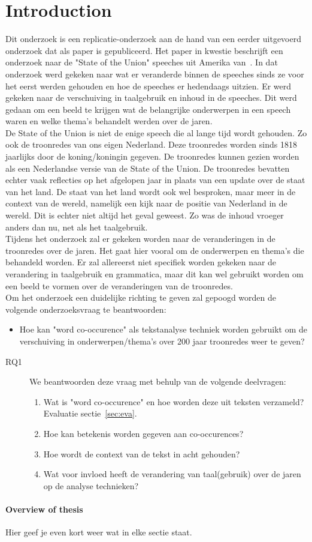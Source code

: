 \section{Introduction}
\label{sec:intro}

Dit onderzoek is een replicatie-onderzoek aan de hand van een eerder uitgevoerd onderzoek dat als paper is gepubliceerd. Het paper in kwestie beschrijft een onderzoek naar de "State of the Union" speeches uit Amerika van~\cite{state}. In dat onderzoek werd gekeken naar wat er veranderde binnen de speeches sinds ze voor het eerst werden gehouden en hoe de speeches er hedendaags uitzien. Er werd gekeken naar de verschuiving in taalgebruik en inhoud in de speeches. Dit werd gedaan om een beeld te krijgen wat de belangrijke onderwerpen in een speech waren en welke thema's behandelt werden over de jaren.
\\
De State of the Union is niet de enige speech die al lange tijd wordt gehouden. Zo ook de troonredes van ons eigen Nederland. Deze troonredes worden sinds 1818 jaarlijks door de koning/koningin gegeven. De troonredes kunnen gezien worden als een Nederlandse versie van de State of the Union. De troonredes bevatten echter vaak reflecties op het afgelopen jaar in plaats van een update over de staat van het land. De staat van het land wordt ook wel besproken, maar meer in de context van de wereld, namelijk een kijk naar de positie van Nederland in de wereld. Dit is echter niet altijd het geval geweest. Zo was de inhoud vroeger anders dan nu, net als het taalgebruik.
\\
Tijdens het onderzoek zal er gekeken worden naar de veranderingen in de troonredes over de jaren. Het gaat hier vooral om de onderwerpen en thema's die behandeld worden. Er zal allereerst niet specifiek worden gekeken naar de verandering in taalgebruik en grammatica, maar dit kan wel gebruikt worden om een beeld te vormen over de veranderingen van de troonredes.
\\
Om het onderzoek een duidelijke richting te geven zal gepoogd worden de volgende onderzoeksvraag te beantwoorden:

\begin{itemize}
\item Hoe kan "word co-occurence" als tekstanalyse techniek worden gebruikt om de verschuiving in onderwerpen/thema's over 200 jaar troonredes weer te geven?
\end{itemize}

\begin{description}
\item[RQ1]  We   beantwoorden deze vraag met behulp van de volgende deelvragen:
\begin{enumerate}
\item Wat is "word co-occurence" en hoe worden deze uit teksten verzameld? Evaluatie sectie~\ref{sec:eva}.
\item Hoe kan betekenis worden gegeven aan co-occurences?
\item Hoe wordt de context van de tekst in acht gehouden?
\item Wat voor invloed heeft de verandering van taal(gebruik) over de jaren op de analyse technieken?
\end{enumerate}
\end{description}


\paragraph{Overview of thesis}
Hier geef je even kort weer wat in elke sectie staat.